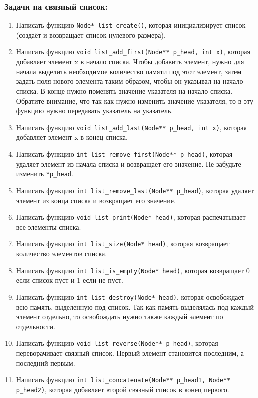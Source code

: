 \documentclass{article}
\begin{document}
\newpage
\subsubsection*{Задачи на связный список:}
\begin{enumerate}
\item Написать функцию \texttt{Node* list\_create()}, которая инициализирует список (создаёт и возвращает список нулевого размера). 
\item Написать функцию \texttt{void list\_add\_first(Node** p\_head, int x)}, которая добавляет элемент x в начало списка. Чтобы добавить элемент, нужно для начала выделить необходимое количество памяти под этот элемент, затем задать поля нового элемента таким образом, чтобы он указывал на начало списка. В конце нужно поменять значение указателя на начало списка. Обратите внимание, что так как нужно изменить значение указателя, то в эту функцию нужно передавать указатель на указатель.
\item Написать функцию \texttt{void list\_add\_last(Node** p\_head, int x)}, которая добавляет элемент x в конец списка. 
\item Написать функцию \texttt{int list\_remove\_first(Node** p\_head)}, которая удаляет элемент из начала списка и возвращает его значение. Не забудьте изменить \texttt{*p\_head}.
\item Написать функцию \texttt{int list\_remove\_last(Node** p\_head)}, которая удаляет элемент из конца списка и возвращает его значение. 
\item Написать функцию \texttt{void list\_print(Node* head)}, которая распечатывает все элементы списка.
\item Написать функцию \texttt{int list\_size(Node* head)}, которая возвращает количество элементов списка.
\item Написать функцию \texttt{int list\_is\_empty(Node* head)}, которая возвращает 0 если список пуст и 1 если не пуст.
\item Написать функцию \texttt{int list\_destroy(Node* head)}, которая освобождает всю память, выделенную под список. Так как память выделялась под каждый элемент отдельно, то освобождать нужно также каждый элемент по отдельности.

\item Написать функцию \texttt{void list\_reverse(Node** p\_head)}, которая переворачивает связный список. Первый элемент становится последним, а последний первым. 

\item Написать функцию \texttt{int list\_concatenate(Node** p\_head1, Node** p\_head2)}, которая добавляет второй связный список в конец первого.


\end{enumerate}
\end{document}
